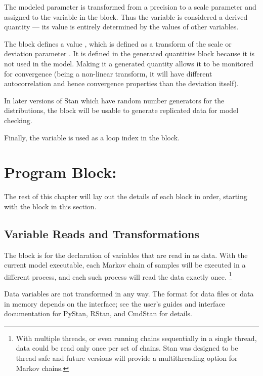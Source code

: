 The modeled parameter  is transformed from a precision to
a scale parameter and assigned to the variable  in the
 block. Thus the variable 
is considered a derived quantity --- its value is entirely determined
by the values of other variables.

The  block defines a value
, which is defined as a transform of the scale or
deviation parameter .  It is defined in the generated
quantities block because it is not used in the model.  Making it
a generated quantity allows it to be monitored for convergence (being
a non-linear transform, it will have different autocorrelation and
hence convergence properties than the deviation itself).

In later versions of Stan which have random number generators for
the distributions, the  block will be
usable to generate replicated data for model checking.

Finally, the variable  is used as a loop index in the
 block.


\section{Program Block: }

The rest of this chapter will lay out the details of each block in
order, starting with the  block in this section.

\subsection{Variable Reads and Transformations}

The  block is for the declaration of variables that are
read in as data.  With the current model executable, each Markov chain
of samples will be executed in a different process, and each such
process will read the data exactly once.%
%
\footnote{With multiple threads, or even running chains sequentially
  in a single thread, data could be read only once per set of
  chains. Stan was designed to be thread safe and future versions
  will provide a multithreading option for Markov chains.\label{thread.footnote}}
%

Data variables are not transformed in any way.  The format for data
files or data in memory depends on the interface; see the user's
guides and interface documentation for PyStan, RStan, and CmdStan for details.

